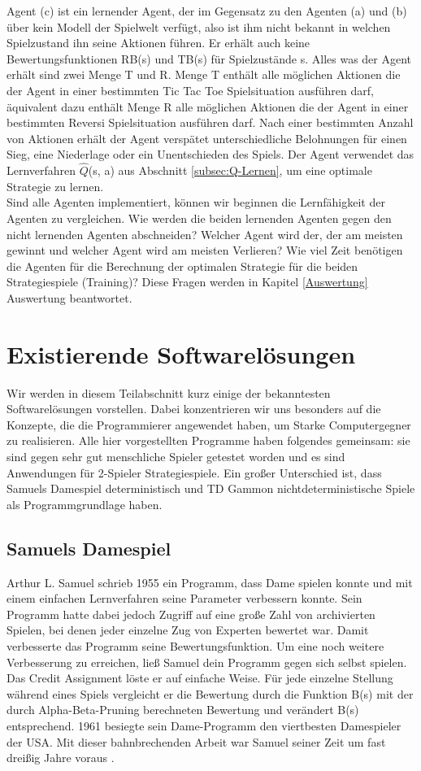 Agent (c) ist ein lernender Agent, der im Gegensatz zu den Agenten (a) und (b) über kein Modell der Spielwelt verfügt, also ist ihm nicht bekannt in welchen Spielzustand ihn seine Aktionen führen. Er erhält auch keine Bewertungsfunktionen RB(s) und TB(s) für Spielzustände s. Alles was der Agent erhält sind zwei Menge T und R. Menge T enthält alle möglichen Aktionen die der Agent in einer bestimmten Tic Tac Toe Spielsituation ausführen darf, äquivalent dazu enthält Menge R alle möglichen Aktionen die der Agent in einer bestimmten Reversi Spielsituation ausführen darf. Nach einer bestimmten Anzahl von Aktionen erhält der Agent verspätet unterschiedliche Belohnungen für einen Sieg, eine Niederlage oder ein Unentschieden des Spiels. Der Agent verwendet das Lernverfahren $\hat{Q}$(s, a) aus Abschnitt  \ref{subsec:Q-Lernen}, um eine optimale Strategie zu lernen. \\

Sind alle Agenten implementiert, können wir beginnen die Lernfähigkeit der Agenten zu vergleichen. Wie werden die beiden lernenden Agenten gegen den nicht lernenden Agenten abschneiden? Welcher Agent wird der, der am meisten gewinnt und welcher Agent wird am meisten Verlieren? Wie viel Zeit benötigen die Agenten für die Berechnung der optimalen Strategie für die beiden Strategiespiele (Training)? Diese Fragen werden in Kapitel \ref{Auswertung} Auswertung beantwortet.

\section{Existierende Softwarelösungen}
Wir werden in diesem Teilabschnitt kurz einige der bekanntesten Softwarelösungen vorstellen. Dabei konzentrieren wir uns besonders auf die Konzepte, die die Programmierer angewendet haben, um Starke Computergegner zu realisieren. Alle hier vorgestellten Programme haben folgendes gemeinsam: sie sind gegen sehr gut menschliche Spieler getestet worden und es sind Anwendungen für 2-Spieler Strategiespiele. Ein großer Unterschied ist, dass Samuels Damespiel deterministisch und TD Gammon nichtdeterministische Spiele als Programmgrundlage haben.

\subsection{Samuels Damespiel}
Arthur L. Samuel schrieb 1955 ein Programm, dass Dame spielen konnte und mit einem einfachen Lernverfahren seine Parameter verbessern konnte. Sein Programm hatte dabei jedoch Zugriff auf eine große Zahl von archivierten Spielen, bei denen jeder einzelne Zug von Experten bewertet war. Damit verbesserte das Programm seine Bewertungsfunktion. Um eine noch weitere Verbesserung zu erreichen, ließ Samuel dein Programm gegen sich selbst spielen. Das Credit Assignment löste er auf einfache Weise. Für jede einzelne Stellung während eines Spiels vergleicht er die Bewertung durch die Funktion B(s) mit der durch Alpha-Beta-Pruning berechneten Bewertung und verändert B(s) entsprechend. 1961 besiegte sein Dame-Programm den viertbesten Damespieler der USA. Mit dieser bahnbrechenden Arbeit war Samuel seiner Zeit um fast dreißig Jahre voraus \cite[120\psq]{Ertel}.

